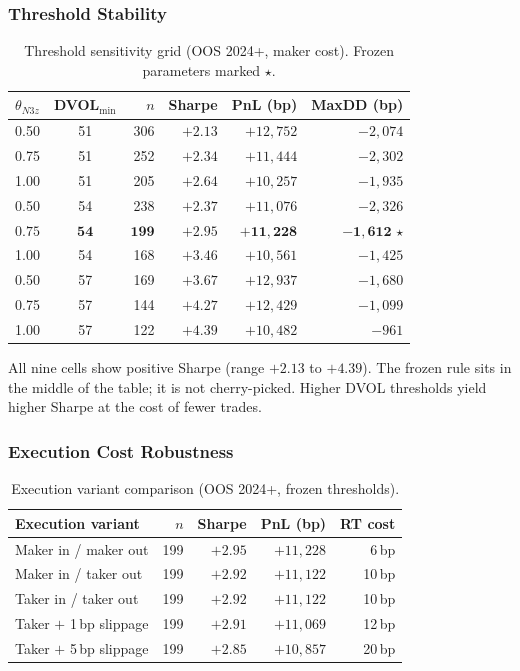 \documentclass[12pt, a4paper]{article}
\theoremstyle{definition}
\begin{document}
\subsubsection*{Threshold Stability}

\begin{table}[H]
\centering
\caption{Threshold sensitivity grid (OOS 2024+, maker cost). Frozen
         parameters marked $\star$.}
\label{tab:backtest_thresh}
\begin{tabular}{ccrrrr}
\hline
$\theta_{N3z}$ & DVOL$_{\min}$ & $n$ & Sharpe & PnL (bp) & MaxDD (bp) \\
\hline
0.50 & 51 & 306 & $+2.13$ & $+12{,}752$ & $-2{,}074$ \\
0.75 & 51 & 252 & $+2.34$ & $+11{,}444$ & $-2{,}302$ \\
1.00 & 51 & 205 & $+2.64$ & $+10{,}257$ & $-1{,}935$ \\
\hline
0.50 & 54 & 238 & $+2.37$ & $+11{,}076$ & $-2{,}326$ \\
$\mathbf{0.75}$ & $\mathbf{54}$ & $\mathbf{199}$ & $\mathbf{+2.95}$ & $\mathbf{+11{,}228}$ & $\mathbf{-1{,}612}$ $\star$ \\
1.00 & 54 & 168 & $+3.46$ & $+10{,}561$ & $-1{,}425$ \\
\hline
0.50 & 57 & 169 & $+3.67$ & $+12{,}937$ & $-1{,}680$ \\
0.75 & 57 & 144 & $+4.27$ & $+12{,}429$ & $-1{,}099$ \\
1.00 & 57 & 122 & $+4.39$ & $+10{,}482$ &   $-961$   \\
\hline
\end{tabular}
\end{table}

All nine cells show positive Sharpe (range $+2.13$ to $+4.39$).  The frozen
rule sits in the middle of the table; it is not cherry-picked.  Higher
DVOL thresholds yield higher Sharpe at the cost of fewer trades.

\subsubsection*{Execution Cost Robustness}

\begin{table}[H]
\centering
\caption{Execution variant comparison (OOS 2024+, frozen thresholds).}
\label{tab:backtest_exec}
\begin{tabular}{lrrrr}
\hline
Execution variant & $n$ & Sharpe & PnL (bp) & RT cost \\
\hline
Maker in / maker out    & 199 & $+2.95$ & $+11{,}228$ &  6\,bp \\
Maker in / taker out    & 199 & $+2.92$ & $+11{,}122$ & 10\,bp \\
Taker in / taker out    & 199 & $+2.92$ & $+11{,}122$ & 10\,bp \\
Taker $+$ 1\,bp slippage & 199 & $+2.91$ & $+11{,}069$ & 12\,bp \\
Taker $+$ 5\,bp slippage & 199 & $+2.85$ & $+10{,}857$ & 20\,bp \\
\hline
\end{tabular}
\end{table}
\end{document}

